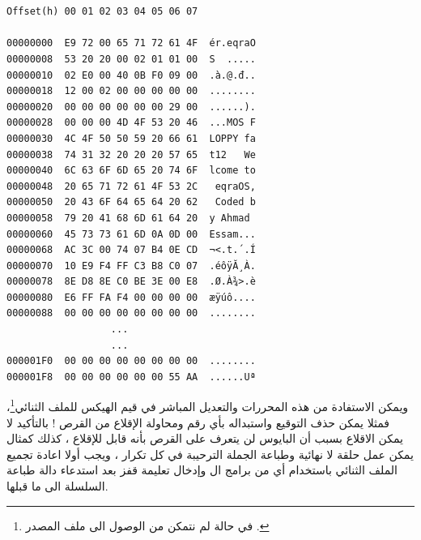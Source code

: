 \documentclass[document.tex]{subfiles}
\begin{document}
\begin{english}


\begin{lstlisting}[label=lst:bootloader_hex,caption=\en{Hex value of bootloader}]


Offset(h) 00 01 02 03 04 05 06 07

00000000  E9 72 00 65 71 72 61 4F  ér.eqraO
00000008  53 20 20 00 02 01 01 00  S  .....
00000010  02 E0 00 40 0B F0 09 00  .à.@.đ..
00000018  12 00 02 00 00 00 00 00  ........
00000020  00 00 00 00 00 00 29 00  ......).
00000028  00 00 00 4D 4F 53 20 46  ...MOS F
00000030  4C 4F 50 50 59 20 66 61  LOPPY fa
00000038  74 31 32 20 20 20 57 65  t12   We
00000040  6C 63 6F 6D 65 20 74 6F  lcome to
00000048  20 65 71 72 61 4F 53 2C   eqraOS,
00000050  20 43 6F 64 65 64 20 62   Coded b
00000058  79 20 41 68 6D 61 64 20  y Ahmad 
00000060  45 73 73 61 6D 0A 0D 00  Essam...
00000068  AC 3C 00 74 07 B4 0E CD  ¬<.t.´.Í
00000070  10 E9 F4 FF C3 B8 C0 07  .éôÿĂ¸À.
00000078  8E D8 8E C0 BE 3E 00 E8  .Ø.À¾>.è
00000080  E6 FF FA F4 00 00 00 00  æÿúô....
00000088  00 00 00 00 00 00 00 00  ........
                  ...
                  ...
000001F0  00 00 00 00 00 00 00 00  ........
000001F8  00 00 00 00 00 00 55 AA  ......Uª

\end{lstlisting}
\end{english}

ويمكن الاستفادة من هذه المحررات والتعديل المباشر في قيم الهيكس للملف الثنائي\footnote{في حالة لم نتمكن من الوصول الى ملف المصدر .}، فمثلا يمكن حذف التوقيع واستبداله بأي رقم ومحاولة الإقلاع من القرص ! بالتأكيد لا يمكن الاقلاع بسبب أن البايوس لن يتعرف على القرص بأنه قابل للإقلاع ، كذلك كمثال يمكن عمل حلقة لا نهائية وطباعة الجملة الترحيبة في كل تكرار ، ويجب أولا اعادة تجميع الملف الثنائي باستخدام أي من برامج ال  وإدخال تعليمة قفز بعد استدعاء دالة طباعة السلسلة الى ما قبلها.\\

\begin{english}
\lstset{numberstyle=\tiny,numbers=left,stepnumber=1,numbersep=5pt,tabsize=2,extendedchars=true,breaklines=true,frame=b,showspaces=false, showtabs=false,xleftmargin=10pt,framexleftmargin=10pt,framexrightmargin=5pt,framexbottommargin=4pt,showstringspaces=false,language=[x86masm]Assembler}


\end{english}
\end{document}
